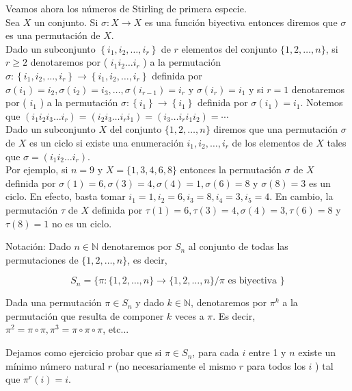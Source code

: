 \documentclass[10pt]{article}
\begin{document}
Veamos ahora los números de Stirling de primera especie.\\
Sea $X$ un conjunto. Si $\sigma: X \longrightarrow X$ es una función biyectiva entonces diremos que $\sigma$ es una permutación de $X$.\\
Dado un subconjunto $\left\{i_{1}, i_{2}, \ldots, i_{r}\right\}$ de $r$ elementos del conjunto $\{1,2, \ldots, n\}$, si $r \geq 2$ denotaremos por ( $i_{1} i_{2} \ldots i_{r}$ ) a la permutación $\sigma:\left\{i_{1}, i_{2}, \ldots, i_{r}\right\} \longrightarrow\left\{i_{1}, i_{2}, \ldots, i_{r}\right\}$ definida por $\sigma\left(i_{1}\right)=i_{2}, \sigma\left(i_{2}\right)=i_{3}, \ldots, \sigma\left(i_{r-1}\right)=i_{r}$ y $\sigma\left(i_{r}\right)=i_{1}$ y si $r=1$ denotaremos por ( $i_{1}$ ) a la permutación $\sigma:\left\{i_{1}\right\} \longrightarrow\left\{i_{1}\right\}$ definida por $\sigma\left(i_{1}\right)=i_{1}$. Notemos que $\left(i_{1} i_{2} i_{3} \ldots i_{r}\right)=\left(i_{2} i_{3} \ldots i_{r} i_{1}\right)=\left(i_{3} \ldots i_{r} i_{1} i_{2}\right)=\cdots$\\
Dado un subconjunto $X$ del conjunto $\{1,2, \ldots, n\}$ diremos que una permutación $\sigma$ de $X$ es un ciclo si existe una enumeración $i_{1}, i_{2}, \ldots, i_{r}$ de los elementos de $X$ tales que $\sigma=\left(i_{1} i_{2} \ldots i_{r}\right)$.\\
Por ejemplo, si $n=9$ y $X=\{1,3,4,6,8\}$ entonces la permutación $\sigma$ de $X$ definida por $\sigma(1)=6, \sigma(3)=4, \sigma(4)=1, \sigma(6)=8$ y $\sigma(8)=3$ es un ciclo. En efecto, basta tomar $i_{1}=1, i_{2}=6, i_{3}=8, i_{4}=3, i_{5}=4$. En cambio, la permutación $\tau$ de $X$ definida por $\tau(1)=6, \tau(3)=4, \sigma(4)=3, \tau(6)=8$ y $\tau(8)=1$ no es un ciclo.

Notación: Dado $n \in \mathbb{N}$ denotaremos por $S_{n}$ al conjunto de todas las permutaciones de $\{1,2, \ldots, n\}$, es decir,

$$
S_{n}=\{\pi:\{1,2, \ldots, n\} \longrightarrow\{1,2, \ldots, n\} / \pi \text { es biyectiva }\}
$$

Dada una permutación $\pi \in S_{n}$ y dado $k \in \mathbb{N}$, denotaremos por $\pi^{k}$ a la permutación que resulta de componer $k$ veces a $\pi$. Es decir, $\pi^{2}=\pi \circ \pi, \pi^{3}=\pi \circ \pi \circ \pi$, etc...

Dejamos como ejercicio probar que si $\pi \in S_{n}$, para cada $i$ entre 1 y $n$ existe un mínimo número natural $r$ (no necesariamente el mismo $r$ para todos los $i$ ) tal que $\pi^{r}(i)=i$.
\end{document}
